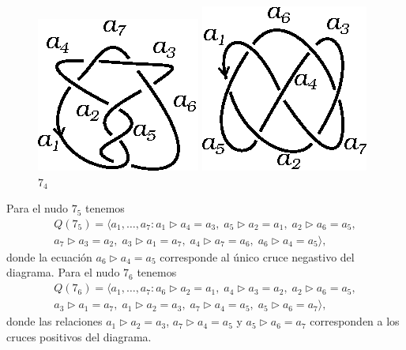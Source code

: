 \documentclass[graybox]{svmult}
\begin{document}
	\begin{figure}[ht]
		\centering
		\begin{minipage}{0.4\textwidth}
			\centering
			\includegraphics[scale=0.7]{images/7_3}
			\caption{$7_3$}
			\label{fig:7_3}
		\end{minipage}
		\begin{minipage}{0.4\textwidth}
			\centering
	    	\includegraphics[scale=0.7]{images/7_4}
			\caption{$7_4$}
			\label{fig:7_4}
		\end{minipage}
	\end{figure}
	
	Para el nudo $7_5$ tenemos
	\begin{multline}
		Q(7_5)=\langle a_1,\dots,a_7:
		a_1\triangleright a_4=a_3,\;
		a_5\triangleright a_2=a_1,\;
		a_2\triangleright a_6=a_5,\\
		a_7\triangleright a_3=a_2,\;
		a_3\triangleright a_1=a_7,\;
		a_4\triangleright a_7=a_6,\;
		a_6\triangleright a_4=a_5\rangle,
	\end{multline}
    donde la ecuación $a_6\triangleright a_4=a_5$ corresponde al único cruce
    negastivo del diagrama.  
	Para el nudo $7_6$ tenemos
	\begin{multline}
		Q(7_6)=\langle a_1,\dots,a_7:
		a_6\triangleright a_2=a_1,\;
		a_4\triangleright a_3=a_2,\;
		a_2\triangleright a_6=a_5,\\
		a_3\triangleright a_1=a_7,\;
		a_1\triangleright a_2=a_3,\;
		a_7\triangleright a_4=a_5,\;
		a_5\triangleright a_6=a_7\rangle,
	\end{multline}
    donde las relaciones $a_1\triangleright a_2=a_3$, $a_7\triangleright
    a_4=a_5$ y $a_5\triangleright a_6=a_7$ corresponden a los cruces positivos
    del diagrama. 
    
\end{document}
